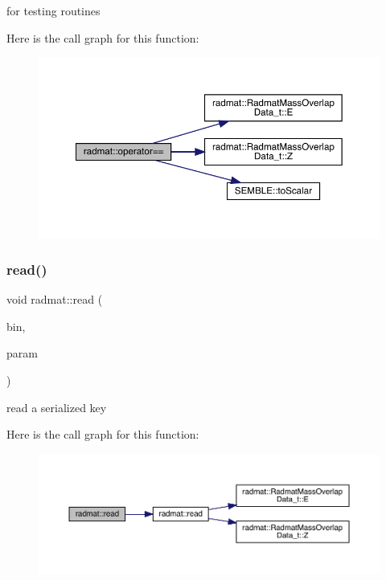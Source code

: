 for testing routines 

Here is the call graph for this function\+:
\nopagebreak
\begin{figure}[H]
\begin{center}
\leavevmode
\includegraphics[width=350pt]{d4/d83/namespaceradmat_a33c106e5957a1e9d566afd6012f2d87e_cgraph}
\end{center}
\end{figure}
\mbox{\label{namespaceradmat_a99ffeb2977d9d4a90de6b401be74526c}} 
\subsubsection{\texorpdfstring{read()}{read()}\hspace{0.1cm}{\footnotesize\ttfamily [1/3]}}
{\footnotesize\ttfamily void radmat\+::read (\begin{DoxyParamCaption}\item[{A\+D\+A\+T\+I\+O\+::\+Binary\+Reader \&}]{bin,  }\item[{\mbox{\hyperlink{structradmat_1_1RadmatExtendedKeyHadronNPartIrrep__t}{Radmat\+Extended\+Key\+Hadron\+N\+Part\+Irrep\+\_\+t}} \&}]{param }\end{DoxyParamCaption})}



read a serialized key 

Here is the call graph for this function\+:
\nopagebreak
\begin{figure}[H]
\begin{center}
\leavevmode
\includegraphics[width=350pt]{d4/d83/namespaceradmat_a99ffeb2977d9d4a90de6b401be74526c_cgraph}
\end{center}
\end{figure}
\mbox{\label{namespaceradmat_ac62d85f3d4d74fc2ca2dc2536a8558fa}} 
